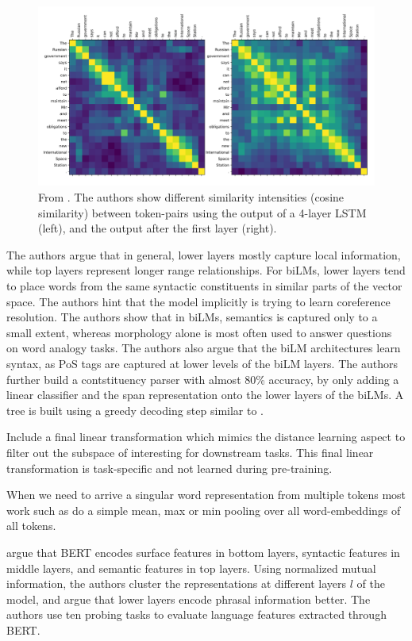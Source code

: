 \documentclass[a4paper,12pt,twoside,openright]{report}
\begin{document}
\begin{figure}[H]
	\center
  \includegraphics[width=0.6\linewidth]{./assets/relatedwork/self_attention_analysis.png}
  \caption{From \cite{peters18}. The authors show different similarity intensities (cosine similarity) between token-pairs using the output of a 4-layer LSTM (left), and the output after the first layer (right).}
  \label{fig:embeddings_by_language}
\end{figure}

The authors argue that in general, lower layers mostly capture local information, while top layers represent longer range relationships.
For biLMs, lower layers tend to place words from the same syntactic constituents in similar parts of the vector space.
The authors hint that the model implicitly is trying to learn coreference resolution.
The authors show that in biLMs, semantics is captured only to a small extent, whereas morphology alone is most often used to answer questions on word analogy tasks.
The authors also argue that the biLM architectures learn syntax, as PoS tags are captured at lower levels of the biLM layers.
The authors further build a contstituency parser with almost 80\% accuracy, by only adding a linear classifier and the span representation onto the lower layers of the biLMs.
A tree is built using a greedy decoding step similar to \cite{joshi19b}.


\cite{moradshahi19} Include a final linear transformation which mimics the distance learning aspect to filter out the subspace of interesting for downstream tasks.
This final linear transformation is task-specific and not learned during pre-training.

When we need to arrive a singular word representation from multiple tokens most work such as \cite{bommasani19, akbik19} do a simple mean, max or min pooling over all word-embeddings of all tokens.

\cite{jawahar19} argue that BERT encodes surface features in bottom layers, syntactic features in middle layers, and semantic features in top layers.
Using normalized mutual information, the authors cluster the representations at different layers $l$ of the model, and argue that lower layers encode phrasal information better.
The authors use ten probing tasks to evaluate language features extracted through BERT.
\end{document}

